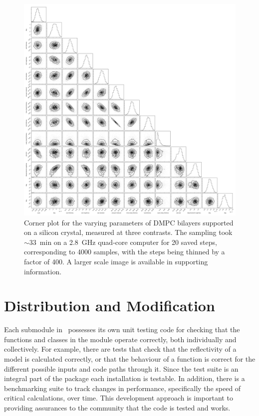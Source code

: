 \documentclass[pdf,preprint]{iucr}
\begin{document}
\begin{figure}
  \includegraphics[width=175mm]{./supporting_information/corner.pdf}
  \caption{Corner plot for the varying parameters of DMPC bilayers supported on a silicon crystal, measured at three contrasts. The sampling took $\sim$\SI{33}{\minute} on a \SI{2.8}{GHz} quad-core computer for 20 saved steps, corresponding to 4000 samples, with the steps being thinned by a factor of 400. A larger scale image is available in supporting information.}
  \label{fig:corner}
\end{figure}

 
\section{Distribution and Modification}

Each submodule in \ possesses its own unit testing code for checking that the functions and classes in the module operate correctly, both individually and collectively. For example, there are tests that check that the reflectivity of a model is calculated correctly, or that the behaviour of a function is correct for the different possible inputs and code paths through it. Since the test suite is an integral part of the package each installation is testable. In addition, there is a benchmarking suite to track changes in performance, specifically the speed of critical calculations, over time. This development approach is important to providing assurances to the community that the code is tested and works.
\end{document}
